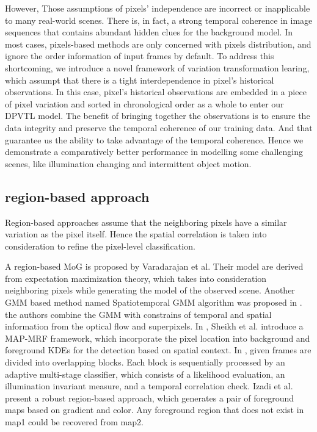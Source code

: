 \documentclass[journal]{IEEEtran}
\begin{document}
However, Those assumptions of pixels' independence are incorrect or inapplicable to many real-world scenes. 
There is, in fact, a strong temporal coherence in image sequences that contains abundant hidden clues for the background model. 
In most cases, pixels-based methods are only concerned with pixels distribution, and ignore the order information of input frames by default.
To address this shortcoming, we introduce a novel framework of variation transformation learing, which assumpt that there is a tight interdependence in pixel's historical observations.
In this case, pixel's historical observations are embedded in a piece of pixel variation and sorted in chronological order as a whole to enter our DPVTL model.
The benefit of bringing together the observations is to ensure the data integrity and preserve the temporal coherence of our training data. And that guarantee us the ability to take advantage of the temporal coherence. 
Hence we demonstrate a comparatively better performance in modelling some challenging scenes, like illumination changing and intermittent object motion.
\subsection{region-based approach}
Region-based approaches assume that the neighboring pixels have a similar variation as the pixel itself. Hence the spatial correlation is taken into consideration to refine the pixel-level classification.

A region-based MoG is proposed by Varadarajan et al.\cite{2015_PR_Varadarajan20153488} Their model are derived from expectation maximization theory, which takes into consideration neighboring pixels while generating the model of the observed scene.
Another GMM based method named Spatiotemporal GMM algorithm was proposed in \cite{2017_TPAMI_GANGWANG}. the authors combine the GMM with constrains of temporal and spatial information from the optical flow and superpixels.
In \cite{Sheikh2005Bayesian}, Sheikh et al. introduce a MAP-MRF framework, which incorporate the pixel location into background and foreground KDEs for the detection based on spatial context.
In \cite{Reddy2010Robust}, given frames are divided into overlapping blocks. Each block is sequentially processed by an adaptive multi-stage classifier, which consists of a likelihood evaluation, an illumination invariant measure, and a temporal correlation check.
Izadi et al.\cite{Izadi2008Robust} present a robust region-based approach, which generates a pair of foreground maps based on gradient and color. Any foreground region that does not exist in map1 could be recovered from map2.
\end{document}

